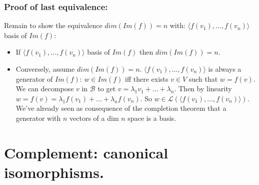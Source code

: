 \documentclass{beamer}
\begin{document}
\begin{frame}
  \frametitle{Proof of last equivalence:}
  Remain to show the equivalence $dim(Im(f)) = n$ with: $\langle f(v_1), \dots, f(v_n) \rangle$ basis of $Im(f)$:
  \begin{itemize}
  \item If $\langle f(v_1), \dots, f(v_n) \rangle$ basis of $Im(f)$ then $dim(Im(f)) = n$.
  \item Conversely, assume $dim(Im(f)) = n$. $\langle f(v_1), \dots, f(v_n) \rangle$ is always a generator of $Im(f)$: $w \in Im(f)$ iff there exists  $v \in V$ such that $w = f(v)$. We can decompose $v$ in $\mathcal{B}$ to get $ v = \lambda_1 v_1 +  \dots + \lambda_n$. Then by linearity $w = f(v) = \lambda_1 f(v_1) + \dots + \lambda_n f(v_n)$. So $w \in \mathcal{L}(\langle f(v_1), \dots, f(v_n) \rangle)$. We've already seen as consequence of the completion theorem that a generator with $n$ vectors of a dim $n$ space is a basis.
  \end{itemize}
\end{frame}



\section{Complement: canonical isomorphisms.}
\end{document}
